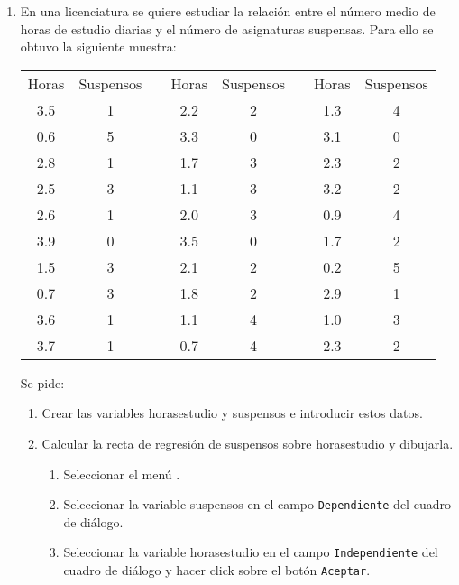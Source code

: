 \begin{enumerate}[leftmargin=*]
\item  En una licenciatura se quiere estudiar la relación entre el número
medio de horas de estudio diarias y el número de asignaturas suspensas. Para ello se
obtuvo la siguiente muestra:
\begin{center}
\begin{tabular}{cccccccc}
  Horas & Suspensos &  & Horas & Suspensos & & Horas & Suspensos  \\
  \cline{1-2}\cline{4-5}\cline{7-8}
  3.5 & 1 & & 2.2 & 2 & & 1.3 & 4 \\
  0.6 & 5 & & 3.3 & 0 & & 3.1 & 0 \\
  2.8 & 1 & & 1.7 & 3 & & 2.3 & 2 \\
  2.5 & 3 & & 1.1 & 3 & & 3.2 & 2 \\
  2.6 & 1 & & 2.0 & 3 & & 0.9 & 4 \\
  3.9 & 0 & & 3.5 & 0 & & 1.7 & 2 \\
  1.5 & 3 & & 2.1 & 2 & & 0.2 & 5 \\
  0.7 & 3 & & 1.8 & 2 & & 2.9 & 1 \\
  3.6 & 1 & & 1.1 & 4 & & 1.0 & 3 \\
  3.7 & 1 & & 0.7 & 4 & & 2.3 & 2 \\
\end{tabular}

\end{center}

Se pide:

\begin{enumerate}
\item  Crear las variables \textsf{horasestudio} y
\textsf{suspensos} e introducir estos datos.

\item  Calcular la recta de regresión de \textsf{suspensos} sobre
\textsf{horasestudio} y dibujarla.

\begin{indicacion}{
\begin{enumerate}
\item Seleccionar el menú .

\item Seleccionar la variable \textsf{suspensos} en el campo
\texttt{Dependiente} del cuadro de diálogo.

\item Seleccionar la variable \textsf{horasestudio} en el campo
\texttt{Independiente} del cuadro de diálogo y hacer click sobre
el botón \texttt{Aceptar}.


\end{enumerate}}
\end{indicacion}
\end{enumerate}
\end{enumerate}
